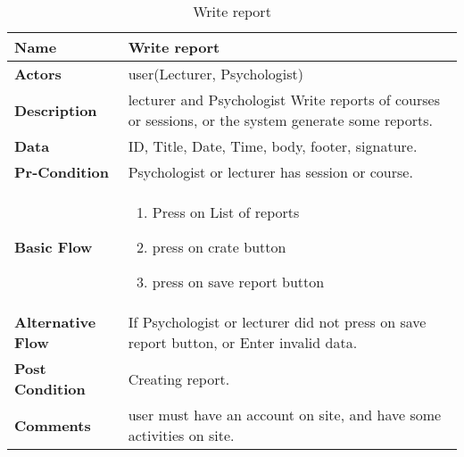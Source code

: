 \documentclass[../Psychological_system_web_application.tex]{subfiles}
\begin{document}
	\begin{center}
		\begin{table}[h]
			\begin{tabular}{ | m{4cm} | m{10cm}| } 
				\hline
			 	\textbf{\large Name}& Write report\\ 
				\hline
			  	\textbf{\large Actors}& user(Lecturer, Psychologist)\\ 
				\hline
			  	\textbf{\large Description}& lecturer and Psychologist Write reports of courses or sessions, or the system generate some reports.\\ 
				\hline
				\textbf{\large Data}& ID, Title, Date, Time, body, footer, signature.\\ 
				\hline
				 \textbf{\large Pr-Condition}& Psychologist or lecturer has session or course. \\ 
				\hline
				\textbf{\large Basic Flow}&\begin{enumerate}
				\item
					Press on List of reports
				\item
					press on crate button
				\item 
					press on save report button \end{enumerate}\\
					\hline
				\textbf{\large Alternative Flow}& If Psychologist or lecturer did not press on save report button, or Enter invalid data.\\ 
				\hline
				\textbf{\large Post Condition}& Creating report.\\ 
				\hline
				\textbf{\large Comments}& user must have an account on site, and have some activities on site.\\ 
				\hline
			\end{tabular}
			\caption{Write report}
			\label{table:WRITE-REPORT}
		\end{table}
	\end{center}
	
\end{document}
